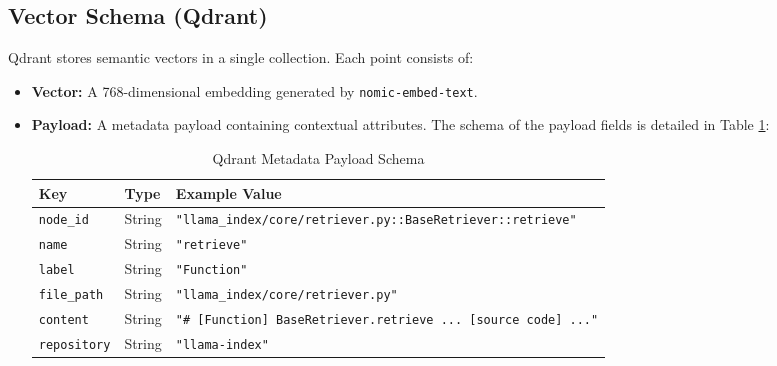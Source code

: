 \documentclass[12pt,a4paper,oneside]{report}
\begin{document}
\subsection{Vector Schema (Qdrant)}
Qdrant stores semantic vectors in a single collection. Each point consists of:
\begin{itemize}
    \item \textbf{Vector:} A 768-dimensional embedding generated by \texttt{nomic-embed-text}.
    \item \textbf{Payload:} A metadata payload containing contextual attributes. The schema of the payload fields is detailed in Table \ref{tab:qdrant_payload}:
    \begin{table}[h]
        \centering
        \caption{Qdrant Metadata Payload Schema}
        \label{tab:qdrant_payload}
        \begin{tabular}{lll}
            \toprule
            \textbf{Key} & \textbf{Type} & \textbf{Example Value} \\
            \midrule
            \texttt{node\_id} & String & \texttt{"llama\_index/core/retriever.py::BaseRetriever::retrieve"} \\
            \texttt{name} & String & \texttt{"retrieve"} \\
            \texttt{label} & String & \texttt{"Function"} \\
            \texttt{file\_path} & String & \texttt{"llama\_index/core/retriever.py"} \\
            \texttt{content} & String & \texttt{"\# [Function] BaseRetriever.retrieve ... [source code] ..."} \\
            \texttt{repository} & String & \texttt{"llama-index"} \\
            \bottomrule
        \end{tabular}
    \end{table}
\end{itemize}
\end{document}
